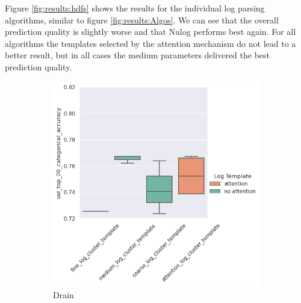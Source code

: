 Figure \ref{fig:results:hdfs} shows the results for the individual log parsing algorithms, similar to figure \ref{fig:results:Algos}. We can see that the overall prediction quality is slightly worse and that Nulog performs best again. For all algorithms the templates selected by the attention mechanism do not lead to a better result, but in all cases the medium parameters delivered the best prediction quality. 

\begin{figure}[H]
     \centering
     \begin{subfigure}[b]{0.45\textwidth}
         \centering
        \includegraphics[keepaspectratio=true,scale=0.45]{figures/5_results/drain_hdfs.png}
         \caption{Drain}
         \label{fig:results:drain_hdfs}
     \end{subfigure}
     \hfill
     \begin{subfigure}[b]{0.45\textwidth}
         \centering

\end{subfigure}
\end{figure}
